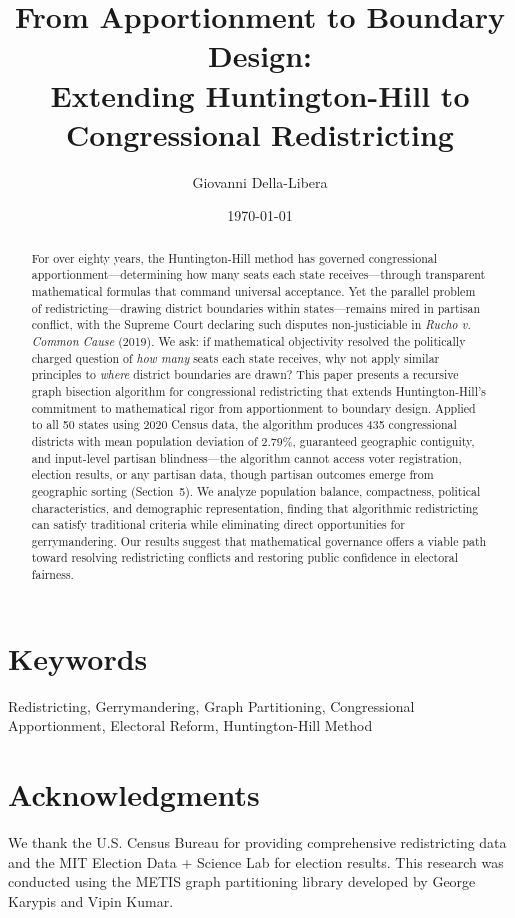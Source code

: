 \documentclass[12pt]{article}
\title{\textbf{From Apportionment to Boundary Design:\\
Extending Huntington-Hill to Congressional Redistricting}}
\author{
Giovanni Della-Libera
}
\date{\today}
\begin{document}
\maketitle

\begin{abstract}
For over eighty years, the Huntington-Hill method has governed congressional apportionment—determining how many seats each state receives—through transparent mathematical formulas that command universal acceptance. Yet the parallel problem of redistricting—drawing district boundaries within states—remains mired in partisan conflict, with the Supreme Court declaring such disputes non-justiciable in \textit{Rucho v. Common Cause} (2019). We ask: if mathematical objectivity resolved the politically charged question of \textit{how many} seats each state receives, why not apply similar principles to \textit{where} district boundaries are drawn? This paper presents a recursive graph bisection algorithm for congressional redistricting that extends Huntington-Hill's commitment to mathematical rigor from apportionment to boundary design. Applied to all 50 states using 2020 Census data, the algorithm produces 435 congressional districts with mean population deviation of 2.79\%, guaranteed geographic contiguity, and input-level partisan blindness—the algorithm cannot access voter registration, election results, or any partisan data, though partisan outcomes emerge from geographic sorting (Section~5). We analyze population balance, compactness, political characteristics, and demographic representation, finding that algorithmic redistricting can satisfy traditional criteria while eliminating direct opportunities for gerrymandering. Our results suggest that mathematical governance offers a viable path toward resolving redistricting conflicts and restoring public confidence in electoral fairness.
\end{abstract}

\section*{Keywords}
Redistricting, Gerrymandering, Graph Partitioning, Congressional Apportionment, Electoral Reform, Huntington-Hill Method









\section*{Acknowledgments}
We thank the U.S. Census Bureau for providing comprehensive redistricting data and the MIT Election Data + Science Lab for election results. This research was conducted using the METIS graph partitioning library developed by George Karypis and Vipin Kumar.



\end{document}
